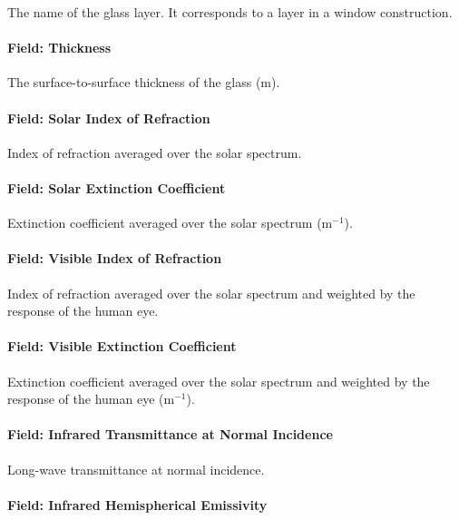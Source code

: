 The name of the glass layer. It corresponds to a layer in a window construction.

\paragraph{Field: Thickness}\label{field-thickness-2}

The surface-to-surface thickness of the glass (m).

\paragraph{Field: Solar Index of Refraction}\label{field-solar-index-of-refraction}

Index of refraction averaged over the solar spectrum.

\paragraph{Field: Solar Extinction Coefficient}\label{field-solar-extinction-coefficient}

Extinction coefficient averaged over the solar spectrum (m\(^{-1}\)).

\paragraph{Field: Visible Index of Refraction}\label{field-visible-index-of-refraction}

Index of refraction averaged over the solar spectrum and weighted by the response of the human eye.

\paragraph{Field: Visible Extinction Coefficient}\label{field-visible-extinction-coefficient}

Extinction coefficient averaged over the solar spectrum and weighted by the response of the human eye (m\(^{-1}\)).

\paragraph{Field: Infrared Transmittance at Normal Incidence}\label{field-infrared-transmittance-at-normal-incidence-1}

Long-wave transmittance at normal incidence.

\paragraph{Field: Infrared Hemispherical Emissivity}\label{field-infrared-hemispherical-emissivity}

